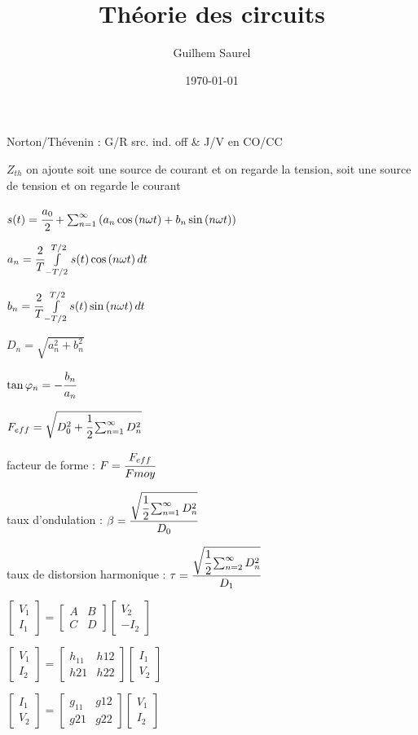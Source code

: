 \documentclass[10pt,twocolumn,a4paper]{article}
\title{Théorie des circuits}
\date{\today}
\author{Guilhem Saurel}
\begin{document}
\maketitle
Norton/Thévenin : G/R src. ind. off \& J/V en CO/CC

$Z_{th}$ on ajoute soit une source de courant et on regarde la tension, soit une source de tension et on regarde le courant

$s(t)= \cfrac{a_0}{2} + \sum_{n=1}^{\infty}{\left( a_n \cos\left(n\omega t\right) + b_n \sin\left(n \omega t \right) \right)}$

$a_n = \cfrac{2}{T} \int \limits_{-T/2}^{T/2}{s(t)\cos\left(n\omega t\right) dt}$

$b_n = \cfrac{2}{T} \int \limits_{-T/2}^{T/2}{s(t)\sin\left(n\omega t\right) dt}$

$D_n = \sqrt{a_n^2+b_n^2}$

$\tan\varphi_n = - \cfrac{b_n}{a_n}$

$F_{eff} = \sqrt{D_0^2 + \cfrac{1}{2}\sum_{n=1}^{\infty}{D_n^2}}$

facteur de forme : $F = \cfrac{F_{eff}}{F{moy}}$

taux d'ondulation : $\beta = \cfrac{\sqrt{\cfrac{1}{2}\sum_{n=1}^{\infty}{D_n^2}}}{D_0}$

taux de distorsion harmonique : $\tau = \cfrac{\sqrt{\cfrac{1}{2}\sum_{n=2}^{\infty}{D_n^2}}}{D_1}$

$\begin{bmatrix}V_1 \\ I_1\end{bmatrix} = \begin{bmatrix}A&B\\C&D \end{bmatrix}\begin{bmatrix}V_2\\-I_2 \end{bmatrix}$

$\begin{bmatrix}V_1\\I_2 \end{bmatrix} =\begin{bmatrix}h_{11}&h{12}\\h{21}&h{22} \end{bmatrix}\begin{bmatrix}I_1\\V_2 \end{bmatrix} $

$\begin{bmatrix}I_1\\V_2 \end{bmatrix} =\begin{bmatrix}g_{11}&g{12}\\g{21}&g{22} \end{bmatrix}\begin{bmatrix}V_1\\I_2 \end{bmatrix} $
\end{document}
